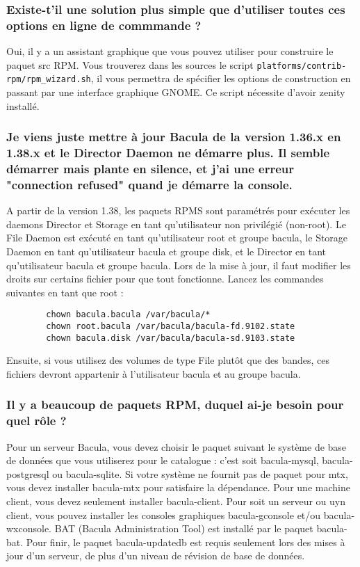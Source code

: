    \subsubsection{Existe-t'il une solution plus simple que d'utiliser toutes ces
   options en ligne de commmande ?}
   Oui, il y a un assistant graphique que vous pouvez utiliser pour construire
   le paquet src RPM. Vous trouverez dans les sources le script
   \texttt{platforms/contrib-rpm/rpm\_wizard.sh}, il vous permettra de spécifier
   les options de construction en passant par une interface graphique GNOME. Ce
   script nécessite d'avoir zenity installé.
   
   \subsubsection{Je viens juste mettre à jour Bacula de la version 1.36.x en
   1.38.x et le Director Daemon ne démarre plus. Il semble démarrer mais plante
   en silence, et j'ai une erreur "connection refused" quand je démarre la 
   console.} 
   A partir de la version 1.38, les paquets RPMS sont paramétrés pour exécuter
   les daemons Director et Storage en tant qu'utilisateur non privilégié 
   (non-root). Le File Daemon est exécuté en tant qu'utilisateur root et groupe
   bacula, le Storage Daemon en tant qu'utilisateur bacula et groupe disk, et le
   Director en tant qu'utilisateur bacula et groupe bacula. Lors de la mise à 
   jour, il faut modifier les droits sur certains fichier pour que tout 
   fonctionne.   Lancez les commandes suivantes en tant que root :

\footnotesize
\begin{verbatim}
        chown bacula.bacula /var/bacula/*
        chown root.bacula /var/bacula/bacula-fd.9102.state
        chown bacula.disk /var/bacula/bacula-sd.9103.state
\end{verbatim}
\normalsize

Ensuite, si vous utilisez des volumes de type File plutôt que des bandes, ces
fichiers devront appartenir à l'utilisateur bacula et au groupe bacula.
  
   \subsubsection{Il y a beaucoup de paquets RPM, duquel ai-je besoin pour quel
   rôle ?}
   Pour un serveur Bacula, vous devez choisir le paquet suivant le système de 
   base de données que vous utiliserez pour le catalogue : c'est soit
   bacula-mysql, bacula-postgresql ou bacula-sqlite. Si votre système ne fournit
   pas de paquet pour mtx, vous devez installer bacula-mtx pour satisfaire la
   dépendance. Pour une machine client, vous devez seulement installer 
   bacula-client. Pour soit un serveur ou uyn client, vous pouvez installer 
   les consoles graphiques bacula-gconsole et/ou bacula-wxconsole. BAT (Bacula
   Administration Tool) est installé par le paquet bacula-bat. Pour finir, le
   paquet bacula-updatedb est requis seulement lors des mises à jour d'un 
   serveur, de plus d'un niveau de révision de base de données. 


